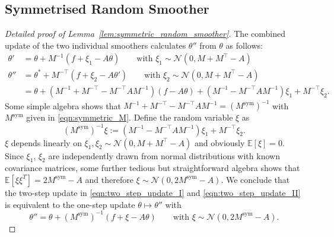 \documentclass[11pt,english]{article}
\theoremstyle{plain}
\theoremstyle{plain}
\theoremstyle{plain}
\theoremstyle{plain}
\numberwithin{equation}{section}
\begin{document}
\subsection{Symmetrised Random Smoother}\label{sec:proof_lem:symmetric_random_smoother}
\begin{proof}[Detailed proof of Lemma~\ref{lem:symmetric_random_smoother}]
	The combined update of the two individual smoothers calculates $\theta''$ from $\theta$ as follows:
	\begin{subequations}
		\begin{align}
			\theta'  & =\theta+M^{-1}(f+\xi_1-A \theta)\qquad\text{with $\xi_1\sim\mathcal{N}(0,M+M^{\top}-A)$}       \label{eqn:two_step_update_I}  \\
			\theta'' & =\theta^*+M^{-\top}(f+\xi_2-A \theta')\qquad\text{with $\xi_2\sim\mathcal{N}(0,M+M^{\top}-A)$} \label{eqn:two_step_update_II} \\
			         & = \theta +\left(M^{-1}+M^{-\top}-M^{-\top}AM^{-1}\right) (f-A\theta)
			+ \left(M^{-1}-M^{-\top}AM^{-1}\right)\xi_1 + M^{-\top} \xi_2.\nonumber
		\end{align}
	\end{subequations}
	Some simple algebra shows that $M^{-1}+M^{-\top}-M^{-\top}AM^{-1} = (M^{\mathrm{sym}})^{-1}$ with $M^{\mathrm{sym}}$ given in \eqref{eqn:symmetric_M}. Define the random variable $\xi$ as
	\begin{equation}
		(M^{\mathrm{sym}})^{-1} \xi := \left(M^{-1}-M^{-\top}AM^{-1}\right)\xi_1 + M^{-\top} \xi_2.
	\end{equation}
	$\xi$ depends linearly on $\xi_1,\xi_2\sim \mathcal{N}(0,M+M^{\top}-A)$ and obviously $\mathbb{E}[\xi]=0$. Since $\xi_1$, $\xi_2$ are independently drawn from normal distributions with known covariance matrices, some further tedious but straightforward algebra shows that $\mathbb{E}[\xi \xi^T] = 2M^{\mathrm{sym}}-A$ and therefore $\xi\sim \mathcal{N}(0,2M^{\mathrm{sym}}-A)$. We conclude that the two-step update in \eqref{eqn:two_step_update_I} and \eqref{eqn:two_step_update_II} is equivalent to the one-step update $\theta\mapsto \theta''$ with
	\begin{equation}
		\theta''   =\theta+(M^{\mathrm{sym}})^{-1}(f+\xi-A \theta)\qquad\text{with $\xi\sim\mathcal{N}(0,2M^{\mathrm{sym}}-A)$}.
	\end{equation}
\end{proof}
\end{document}
